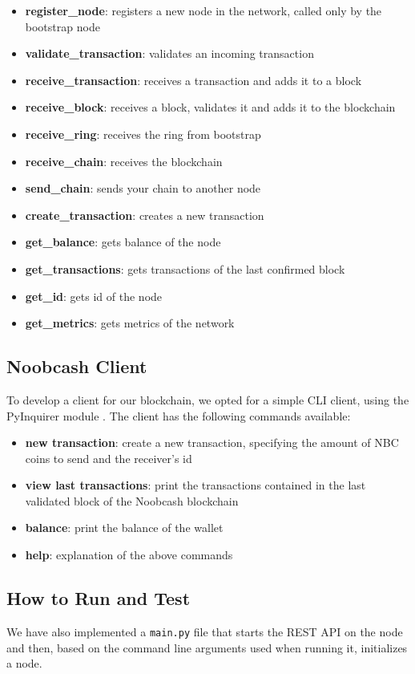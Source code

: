 \documentclass[conference]{IEEEtran}
\begin{document}
\begin{itemize}
\item \textbf{register\_node}: registers a new node in the network, called only by the bootstrap node
\item \textbf{validate\_transaction}: validates an incoming transaction
\item \textbf{receive\_transaction}: receives a transaction and adds it to a block
\item \textbf{receive\_block}: receives a block, validates it and adds it to the blockchain
\item \textbf{receive\_ring}: receives the ring from bootstrap
\item \textbf{receive\_chain}: receives the blockchain
\item \textbf{send\_chain}: sends your chain to another node
\item \textbf{create\_transaction}: creates a new transaction
\item \textbf{get\_balance}: gets balance of the node
\item \textbf{get\_transactions}: gets transactions of the last confirmed block
\item \textbf{get\_id}: gets id of the node
\item \textbf{get\_metrics}: gets metrics of the network
\end{itemize}

\subsection{Noobcash Client}
To develop a client for our blockchain, we opted for a simple CLI client, using the PyInquirer module \cite{b6}.
The client has the following commands available:

\begin{itemize}
\item \textbf{new transaction}: create a new transaction, specifying the amount of NBC coins to send and the receiver's id
\item \textbf{view last transactions}: print the transactions contained in the last validated block of the Noobcash blockchain
\item \textbf{balance}: print the balance of the wallet
\item \textbf{help}: explanation of the above commands
\end{itemize}

\subsection{How to Run and Test}
We have also implemented a \verb|main.py| file that starts the REST API on the node and then, based on the command line arguments used when running it, initializes a node.
\end{document}
